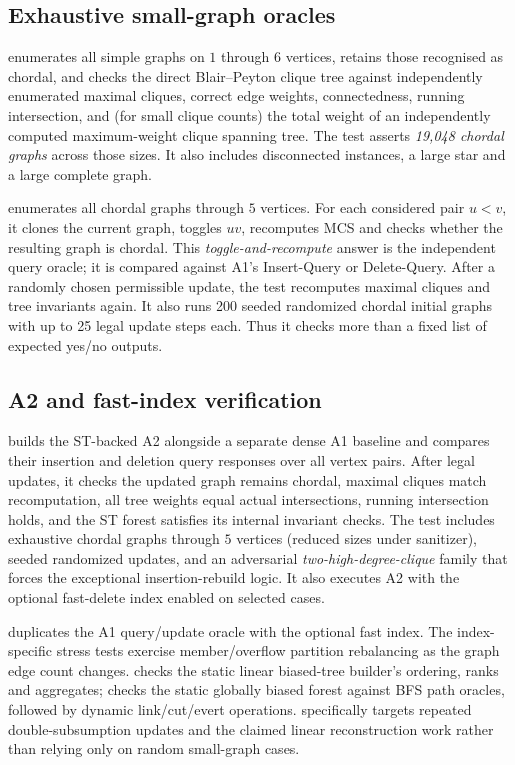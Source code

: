 \subsection{Exhaustive small-graph oracles}
 enumerates all simple graphs on \(1\) through \(6\) vertices, retains those recognised as chordal, and checks the direct Blair--Peyton clique tree against independently enumerated maximal cliques, correct edge weights, connectedness, running intersection, and (for small clique counts) the total weight of an independently computed maximum-weight clique spanning tree.  The test asserts \emph{19,048 chordal graphs} across those sizes.  It also includes disconnected instances, a large star and a large complete graph.

 enumerates all chordal graphs through \(5\) vertices.  For each considered pair \(u<v\), it clones the current graph, toggles \(uv\), recomputes MCS and checks whether the resulting graph is chordal.  This \emph{toggle-and-recompute} answer is the independent query oracle; it is compared against A1's \textsf{Insert-Query} or \textsf{Delete-Query}.  After a randomly chosen permissible update, the test recomputes maximal cliques and tree invariants again.  It also runs 200 seeded randomized chordal initial graphs with up to 25 legal update steps each.  Thus it checks more than a fixed list of expected yes/no outputs.

\subsection{A2 and fast-index verification}
 builds the ST-backed A2 alongside a separate dense A1 baseline and compares their insertion and deletion query responses over all vertex pairs.  After legal updates, it checks the updated graph remains chordal, maximal cliques match recomputation, all tree weights equal actual intersections, running intersection holds, and the ST forest satisfies its internal invariant checks.  The test includes exhaustive chordal graphs through \(5\) vertices (reduced sizes under sanitizer), seeded randomized updates, and an adversarial \emph{two-high-degree-clique} family that forces the exceptional insertion-rebuild logic.  It also executes A2 with the optional fast-delete index enabled on selected cases.

 duplicates the A1 query/update oracle with the optional fast index.  The index-specific stress tests exercise member/overflow partition rebalancing as the graph edge count changes.   checks the static linear biased-tree builder's ordering, ranks and aggregates;  checks the static globally biased forest against BFS path oracles, followed by dynamic link/cut/evert operations.   specifically targets repeated double-subsumption updates and the claimed linear reconstruction work rather than relying only on random small-graph cases.


